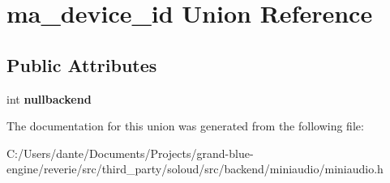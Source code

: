 \hypertarget{unionma__device__id}{}\section{ma\+\_\+device\+\_\+id Union Reference}
\label{unionma__device__id}
\subsection*{Public Attributes}
\begin{DoxyCompactItemize}
\item 
\mbox{\label{unionma__device__id_aa8a46c6ed9d994f4ed08625e5719133f}} 
int {\bfseries nullbackend}
\end{DoxyCompactItemize}


The documentation for this union was generated from the following file\+:\begin{DoxyCompactItemize}
\item 
C\+:/\+Users/dante/\+Documents/\+Projects/grand-\/blue-\/engine/reverie/src/third\+\_\+party/soloud/src/backend/miniaudio/miniaudio.\+h\end{DoxyCompactItemize}
